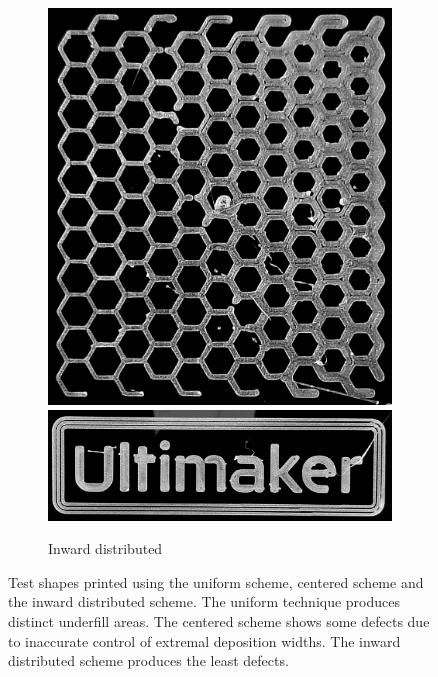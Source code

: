 \begin{figure}
\begin{subfigure}{\figwidth}
\includegraphics[height=\figheight]{sources/applications/P3_print_hex_inward_edited.png}
\includegraphics[width=\figwidth]{sources/applications/P3_print_UM_inward_edited.png}
\caption{Inward distributed}\label{print_inward}
\end{subfigure}
\caption{
Test shapes printed using the uniform scheme, centered scheme and the inward distributed scheme.
The uniform technique produces distinct underfill areas.
The centered scheme shows some defects due to inaccurate control of extremal deposition widths.
The inward distributed scheme produces the least defects.
}
\label{prints}
\end{figure}

